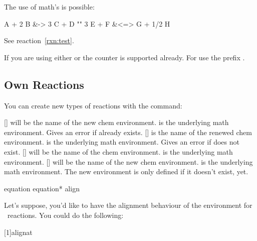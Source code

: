 \documentclass{chemmacros-manual}
\begin{document}
The use of \AmS math's  is possible:
\begin{example}
  \begin{reactions}
    A + 2 B &-> 3 C + D "\label{rxn:test}"
    3 E + F &<=> G + 1/2 H
  \end{reactions}
  See reaction~\ref{rxn:test}.
\end{example}

If you are using either  or  the
 counter is supported already.  For  use the
prefix .

\subsection{Own Reactions}
You can create new types of reactions with the command:
\begin{commands}
  []
     will be the name of the new chem environment.  is
    the underlying math environment.  Gives an error if  already
    exists.
  []
     is the name of the renewed chem environment.  is
    the underlying math environment.  Gives an error if  does not exist.
  []
     will be the name of the chem environment.  is
    the underlying math environment.
  []
     will be the name of the new chem environment.  is
    the underlying math environment.  The new environment is only defined if
    it doesn't exist, yet.
\end{commands}

\begin{sourcecode}
    {equation}
   {equation*}
   {align}
\end{sourcecode}

Let's suppose, you'd like to have the alignment behaviour of the 
environment for \chemformula\ reactions.  You could do the following:

\begin{sourcecode}
  [1]{alignat}
\end{sourcecode}
\end{document}
